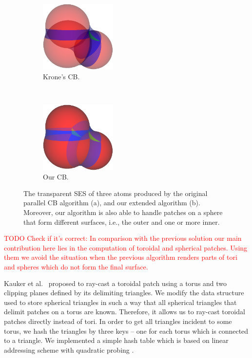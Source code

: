 \begin{figure}[htp]
    \centering
    \begin{subfigure}[t]{0.25\textwidth}
        \centering
        \includegraphics[width=1.5in]{image/cb-krone.png}
        \caption{Krone's CB.}
    \end{subfigure}%
    ~ 
    \begin{subfigure}[t]{0.25\textwidth}
        \centering
        \includegraphics[width=1.5in]{image/cb-oit.png}
        \caption{Our CB.}
    \end{subfigure}
    \caption{The transparent SES of three atoms produced by the original parallel CB algorithm (a), and our extended algorithm (b). Moreover, our algorithm is also able to handle patches on a sphere that form different surfaces, i.e., the outer and one or more inner.}
\end{figure}

\textcolor{red}{TODO Check if it's correct: In comparison with the previous solution our main contribution here lies in the computation of toroidal and spherical patches.
Using them we avoid the situation when the previous algorithm renders parts of tori and spheres which do not form the final surface.}

Kauker et al.~\cite{kauker2013rendering} proposed to ray-cast a toroidal patch using a torus and two clipping planes defined by its delimiting triangles.
We modify the data structure used to store spherical triangles in such a way that all spherical triangles that delimit patches on a torus are known. Therefore, it allows us to ray-cast toroidal patches directly instead of tori.
In order to get all triangles incident to some torus, we hash the triangles by three keys -- one for each torus which is connected to a triangle.
We implemented a simple hash table which is based on linear addressing scheme with quadratic probing \cite{alcantara2011efficient}.

